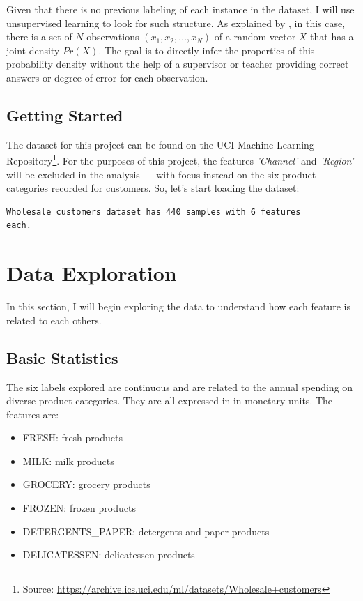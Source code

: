 \documentclass[a4paper]{article}
\begin{document}
Given that there is no previous labeling of each instance in the dataset, I will use unsupervised learning to look for such structure. As explained by \cite{Mitchell}, in this case, there is a set of $N$ observations $(x_1,x_2, ..., x_N )$ of a random vector $X$ that has a joint density $Pr(X)$. The goal is to directly infer the properties of this probability density without the help of a supervisor or teacher providing correct answers or degree-of-error for each observation.

\subsection{Getting Started}
The dataset for this project can be found on the UCI Machine Learning Repository\footnote{Source: \url{https://archive.ics.uci.edu/ml/datasets/Wholesale+customers}}. For the purposes of this project, the features \textit{'Channel'} and \textit{'Region'} will be excluded in the analysis — with focus instead on the six product categories recorded for customers. So, let's start loading the dataset:

\begin{lstlisting}
Wholesale customers dataset has 440 samples with 6 features
each.
\end{lstlisting}



\section{Data Exploration}
\label{sec:data_exploration}
In this section, I will begin exploring the data to understand how each feature is related to each others.

\subsection{Basic Statistics}
The six labels explored are continuous and are related to the annual spending on diverse product categories. They are all expressed in in monetary units. The features are:
\begin{itemize}
\item FRESH: fresh products
\item MILK: milk products
\item GROCERY: grocery products
\item FROZEN: frozen products
\item DETERGENTS\_PAPER: detergents and paper products
\item DELICATESSEN: delicatessen products
\end{itemize}
\end{document}

